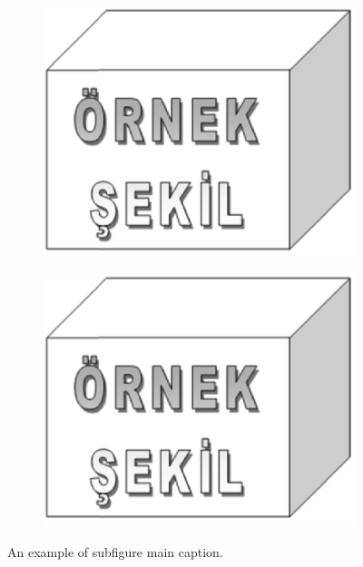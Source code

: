 \begin{figure}[h]
	\centering
	\begin{subfigure}{.8\textwidth}
		\centering
		\includegraphics[scale=.3]{./fig/sekil1}
		\label{Figure2.2a}
	\end{subfigure}
	\begin{subfigure}{.8\textwidth}
		\centering
		\includegraphics[scale=.3]{./fig/sekil1}
		\label{Figure2.2b}
	\end{subfigure}
    \caption{An example of subfigure main caption.}\label{Figure2.2}
\end{figure}

